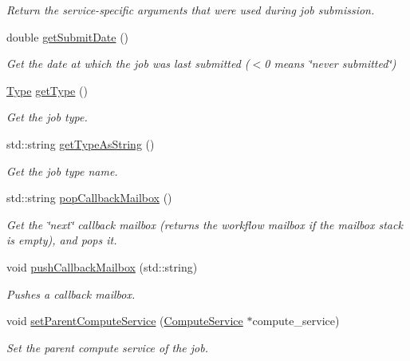 \begin{DoxyCompactItemize}
\begin{DoxyCompactList}\small\item\em Return the service-\/specific arguments that were used during job submission. \end{DoxyCompactList}\item 
double \hyperlink{classwrench_1_1_workflow_job_a05f015d4d97263662bf2d6d617611a34}{get\+Submit\+Date} ()
\begin{DoxyCompactList}\small\item\em Get the date at which the job was last submitted ($<$0 means \char`\"{}never submitted\char`\"{}) \end{DoxyCompactList}\item 
\hyperlink{classwrench_1_1_workflow_job_a5dcf81c50b5d221ef2a48126bf45d08b}{Type} \hyperlink{classwrench_1_1_workflow_job_a1883671a4e72877bb7fcb0ce771fdc7e}{get\+Type} ()
\begin{DoxyCompactList}\small\item\em Get the job type. \end{DoxyCompactList}\item 
std\+::string \hyperlink{classwrench_1_1_workflow_job_a8162ab7d79c56373d610f8cb7b3f1f07}{get\+Type\+As\+String} ()
\begin{DoxyCompactList}\small\item\em Get the job type name. \end{DoxyCompactList}\item 
std\+::string \hyperlink{classwrench_1_1_workflow_job_a70b0cde49a330b62a7e77382e6eddbe1}{pop\+Callback\+Mailbox} ()
\begin{DoxyCompactList}\small\item\em Get the \char`\"{}next\char`\"{} callback mailbox (returns the workflow mailbox if the mailbox stack is empty), and pops it. \end{DoxyCompactList}\item 
void \hyperlink{classwrench_1_1_workflow_job_a1f62a743be61fe41904c31ab8d6f9ce7}{push\+Callback\+Mailbox} (std\+::string)
\begin{DoxyCompactList}\small\item\em Pushes a callback mailbox. \end{DoxyCompactList}\item 
void \hyperlink{classwrench_1_1_workflow_job_a96033386025a2f99584c73bc22c58f64}{set\+Parent\+Compute\+Service} (\hyperlink{classwrench_1_1_compute_service}{Compute\+Service} $\ast$compute\+\_\+service)
\begin{DoxyCompactList}\small\item\em Set the parent compute service of the job. \end{DoxyCompactList}\end{DoxyCompactItemize}
